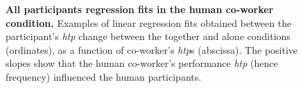 \begin{figure}[hpt]
	\caption{{\bf All participants regression fits in the human co-worker condition.} Examples of linear regression fits obtained between the participant's {\it htp} change between the together and alone conditions (ordinates), as a function of co-worker's {\it htp}s (abscissa). The positive slopes show that the human co-worker's performance {\it htp} (hence frequency) influenced the human participants.}
	\label{S2_Fig}
\end{figure}


